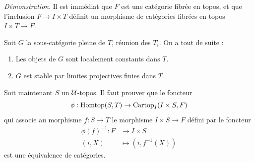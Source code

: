 {\it Démonstration}. Il est immédiat que $F$ est une catégorie fibrée en topos, et que l'inclusion $F \to I \times T$ définit un morphisme de catégories fibrées en topos $I \times T \to F$.

Soit $G$ la sous-catégorie pleine de $T$, réunion des $T_i$. On a tout de suite :
\begin{enumerate}
    \item[(i)] Les objets de $G$ sont localement constants dans $T$.
    \item[(ii)] $G$ est stable par limites projectives finies dans $T$.
\end{enumerate}

Soit maintenant $S$ un ${\cal U}$-topos. Il faut prouver que le foncteur
$$
\phi: \operatorname{Homtop}(S, T) \to \operatorname{Cartop}_I(I \times S, F)
$$
qui associe au morphisme $f: S \to T$ le morphisme $I \times S \to F$ défini par le foncteur
\begin{align*}
\phi(f)^{-1}: F &\to I \times S\\
(i, X) &\mapsto (i, f^{-1}(X))
\end{align*}
est une équivalence de catégories.
